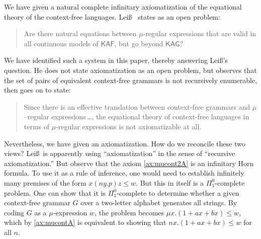 \documentclass[copyright,creativecommons]{eptcs}
\theoremstyle{remark}
\newcommand\mathname[1]{\ensuremath{\mathsf{#1}}}
\newcommand\KAF{\mathname{KAF}}
\newcommand\KAG{\mathname{KAG}}
\newcommand{\fhcomment}[1]{\textcolor{red}{[\textbf{Comment (FH)}: {#1}]}}
\newcommand{\dkcomment}[1]{\textcolor{blue}{[\textbf{Comment (DK)}: {#1}]}}
\renewcommand{\fhcomment}[1]{}
\renewcommand{\dkcomment}[1]{}
\begin{document}
We have given a natural complete infinitary axiomatization of the equational theory of the context-free languages. Lei\ss\ \cite{leiss92b} states as an open problem:
\begin{quote}
Are there natural equations between $\mu$-regular expressions that are valid in all
continuous models of \KAF, but go beyond \KAG?
\end{quote}
We have identified such a system in this paper, thereby answering Lei\ss's question. He does not state axiomatization as an open problem, but observes that the set of pairs of equivalent context-free grammars is not recursively enumerable, then goes on to state:
\begin{quote}
Since there is an effective translation between context-free grammars and $\mu$--regular expressions\,\ldots, the equational theory of context-free languages in terms of $\mu$-regular expressions is not axiomatizable at all.
\end{quote}
Nevertheless, we have given an axiomatization.
How do we reconcile these two views?
Lei\ss\ is apparently using ``axiomatization'' in the sense of ``recursive axiomatization.'' But observe that the axiom
\fhcomment{Change: Remove ``such'' since Lei\ss\ obviously uses
``axiomtization'' in the sense of ``recursive axiomatization''.  Add a statement to this effect (i.e. Lei\ss\ implicitly meaning ``recursive''.}\dkcomment{OK, how about: Nevertheless, we have given an axiomatization.
How do we reconcile these two views?
Lei\ss\ is apparently using ``axiomatization'' in the sense of ``recursive axiomatization''. But observe that the axiom...}\fhcomment{I like it. It makes clear that we are not accusing Lei\ss\ of 
making a technically wrong statement, but of not making the distinction between recursive and unrestricted axiomatization.  No need to appear to want to insult him, given he is bound to referee our paper...}\dkcomment{Unfortunately, this kind of blunts the impact of the statement. If Leiss had meant ``recursive'', he should have said it.}\fhcomment{It's pretty clear he meant it, and, yes, he should have said ``recursive''.  He is not the first one to mentally conflate ``recursive'' into ``axiomatization''.   Committing the mortal sin of 
formulating an inference rule with an undecidable side condition and calling the result an axiomatization can get one into trouble :-).}\eqref{ax:mucont2A} is an infinitary Horn formula. To use it as a rule of inference, one would need to establish infinitely many premises of the form $x(ny.p)z \leq w$. But this in itself is a $\Pi_1^0$-complete problem. One can show that it is $\Pi_1^0$-complete to determine whether a given context-free grammar $G$ over a two-letter alphabet generates all strings. 
\fhcomment{Add textbook reference? E.g.~to your book?}By coding $G$ as a $\mu$-expression $w$, the problem becomes $\mu x.(1 + ax + bx) \leq w$, which by \eqref{ax:mucontA} is equivalent to showing that $nx.(1 + ax + bx)\leq w$ for all $n$.
\fhcomment{This is cool!}
\end{document}
